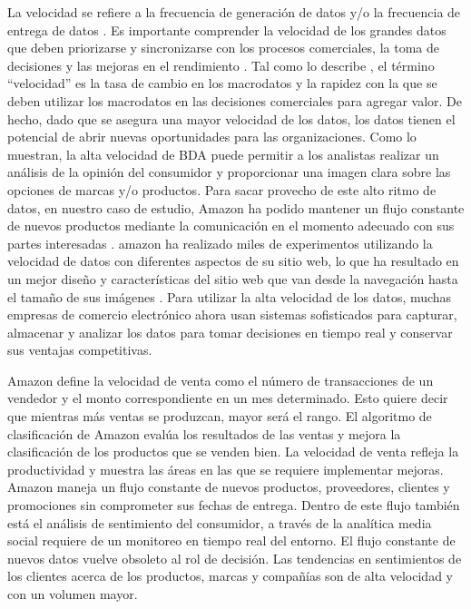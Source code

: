 La velocidad se refiere a la frecuencia de generación de datos y/o la frecuencia de entrega de datos  . Es importante comprender la velocidad de los grandes datos que deben priorizarse y sincronizarse con los procesos comerciales, la toma de decisiones y las mejoras en el rendimiento . Tal como lo describe  , el término ``velocidad'' es la tasa de cambio en los macrodatos y la rapidez con la que se deben utilizar los macrodatos en las decisiones comerciales para agregar valor. De hecho, dado que se asegura una mayor velocidad de los datos, los datos tienen el potencial de abrir nuevas oportunidades para las organizaciones. Como lo muestran, la alta velocidad de BDA puede permitir a los analistas realizar un análisis de la opinión del consumidor y proporcionar una imagen clara sobre las opciones de marcas y/o productos.
Para sacar provecho de este alto ritmo de datos, en nuestro caso de estudio, Amazon ha podido mantener un flujo constante de nuevos productos mediante la comunicación en el momento adecuado con sus partes interesadas . amazon ha realizado miles de experimentos utilizando la velocidad de datos con diferentes aspectos de su sitio web, lo que ha resultado en un mejor diseño y características del sitio web que van desde la navegación hasta el tamaño de sus imágenes . Para utilizar la alta velocidad de los datos, muchas empresas de comercio electrónico ahora usan sistemas sofisticados para capturar, almacenar y analizar los datos para tomar decisiones en tiempo real y conservar sus ventajas competitivas. 

  Amazon define la velocidad de venta como el número de transacciones de un vendedor y el monto correspondiente en un mes determinado. Esto quiere decir que mientras más ventas se produzcan, mayor será el rango. El algoritmo de clasificación de Amazon evalúa los resultados de las ventas y mejora la clasificación de los productos que se venden bien. La velocidad de venta refleja la productividad y muestra las áreas en las que se requiere implementar mejoras.
Amazon maneja un flujo constante de nuevos productos, proveedores, clientes y promociones sin comprometer sus fechas de entrega.
Dentro de este flujo también está el análisis de sentimiento del consumidor, a través de la analítica media social requiere de un monitoreo en tiempo real del entorno. El flujo constante de nuevos datos vuelve obsoleto al rol de decisión. Las tendencias en sentimientos de los clientes acerca de los productos, marcas y compañías son de alta velocidad y con un volumen mayor.
                                                                  
